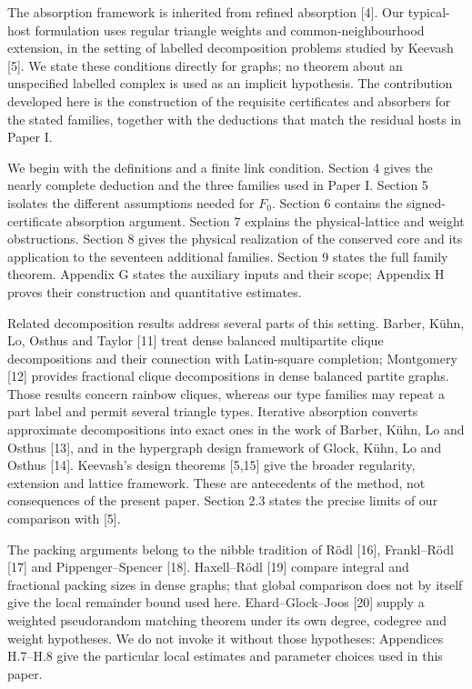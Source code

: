 \documentclass[english,11pt,a4paper]{article}
\begin{document}
The absorption framework is inherited from refined absorption {[}4{]}. Our typical-host formulation uses regular triangle weights and common-neighbourhood extension, in the setting of labelled decomposition problems studied by Keevash {[}5{]}. We state these conditions directly for graphs; no theorem about an unspecified labelled complex is used as an implicit hypothesis. The contribution developed here is the construction of the requisite certificates and absorbers for the stated families, together with the deductions that match the residual hosts in Paper I.

We begin with the definitions and a finite link condition. Section 4 gives the nearly complete deduction and the three families used in Paper I. Section 5 isolates the different assumptions needed for \(F_0\). Section 6 contains the signed-certificate absorption argument. Section 7 explains the physical-lattice and weight obstructions. Section 8 gives the physical realization of the conserved core and its application to the seventeen additional families. Section 9 states the full family theorem. Appendix G states the auxiliary inputs and their scope; Appendix H proves their construction and quantitative estimates.

Related decomposition results address several parts of this setting. Barber, Kühn, Lo, Osthus and Taylor {[}11{]} treat dense balanced multipartite clique decompositions and their connection with Latin-square completion; Montgomery {[}12{]} provides fractional clique decompositions in dense balanced partite graphs. Those results concern rainbow cliques, whereas our type families may repeat a part label and permit several triangle types. Iterative absorption converts approximate decompositions into exact ones in the work of Barber, Kühn, Lo and Osthus {[}13{]}, and in the hypergraph design framework of Glock, Kühn, Lo and Osthus {[}14{]}. Keevash's design theorems {[}5,15{]} give the broader regularity, extension and lattice framework. These are antecedents of the method, not consequences of the present paper. Section 2.3 states the precise limits of our comparison with {[}5{]}.

The packing arguments belong to the nibble tradition of Rödl {[}16{]}, Frankl--Rödl {[}17{]} and Pippenger--Spencer {[}18{]}. Haxell--Rödl {[}19{]} compare integral and fractional packing sizes in dense graphs; that global comparison does not by itself give the local remainder bound used here. Ehard--Glock--Joos {[}20{]} supply a weighted pseudorandom matching theorem under its own degree, codegree and weight hypotheses. We do not invoke it without those hypotheses: Appendices H.7--H.8 give the particular local estimates and parameter choices used in this paper.
\end{document}
